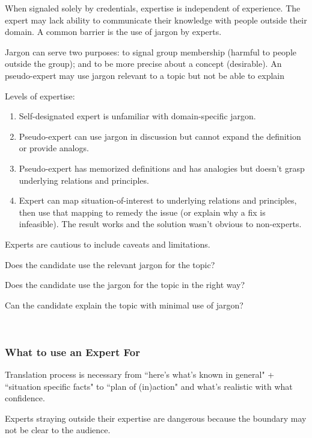 When signaled solely by credentials, expertise is independent of experience. The expert may lack ability to communicate their knowledge with people outside their domain. A common barrier is the use of jargon by experts.

Jargon can serve two purposes: to signal group membership (harmful to people outside the group); and to be more precise about a concept (desirable). An pseudo-expert may use jargon relevant to a topic but not be able to explain

Levels of expertise:
\begin{enumerate}
    \item Self-designated expert is unfamiliar with domain-specific jargon.
    \item Pseudo-expert can use jargon in discussion but cannot expand the definition or provide analogs.
    \item Pseudo-expert has memorized definitions and has analogies but doesn't grasp underlying relations and principles.
    \item Expert can map situation-of-interest to underlying relations and principles, then use that mapping to remedy the issue (or explain why a fix is infeasible). The result works and the solution wasn't obvious to non-experts.
\end{enumerate}


Experts are cautious to include caveats and limitations.

Does the candidate use the relevant jargon for the topic?

Does the candidate use the jargon for the topic in the right way?
    
Can the candidate explain the topic with minimal use of jargon?

\ \\

\subsubsection*{What to use an Expert For}

Translation process is necessary from ``here's what's known in general" + ``situation specific facts" to ``plan of (in)action" and what's realistic with what confidence. 

Experts straying outside their expertise are dangerous because the boundary may not be clear to the audience.


